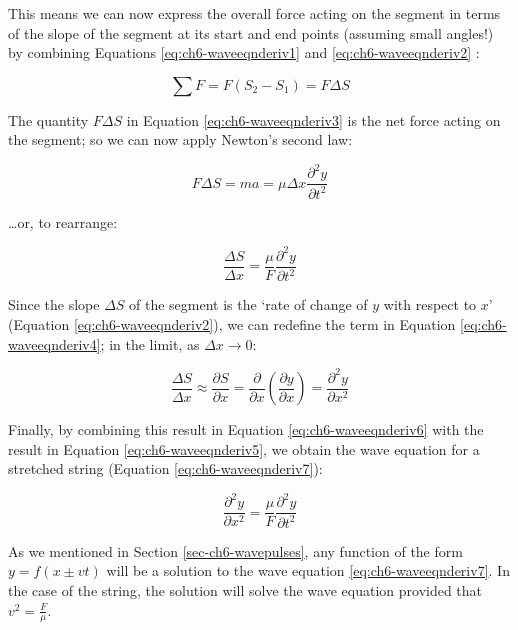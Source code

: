 \documentclass[
]{book}
\begin{document}
This means we can now express the overall force acting on the segment in terms of the slope of the segment at its start and end points (assuming small angles!) by combining Equations \eqref{eq:ch6-waveeqnderiv1} and \eqref{eq:ch6-waveeqnderiv2} :

\begin{equation}
\sum F = F(S_2 - S_1) = F \Delta S
\label{eq:ch6-waveeqnderiv3}
\end{equation}

The quantity \(F\Delta S\) in Equation \eqref{eq:ch6-waveeqnderiv3} is the net force acting on the segment; so we can now apply Newton's second law:

\begin{equation}
F\Delta S = m a = \mu \Delta x \frac{\partial^2 y}{\partial t^2}
\label{eq:ch6-waveeqnderiv4}
\end{equation}

\ldots or, to rearrange:

\begin{equation}
\frac{\Delta S}{\Delta x} = \frac{\mu}{F} \frac{\partial^2 y}{\partial t^2}
\label{eq:ch6-waveeqnderiv5}
\end{equation}

Since the slope \(\Delta S\) of the segment is the `rate of change of \(y\) with respect to \(x\)' (Equation \eqref{eq:ch6-waveeqnderiv2}), we can redefine the term in Equation \eqref{eq:ch6-waveeqnderiv4}; in the limit, as \(\Delta x \rightarrow 0\):

\begin{equation}
\frac{\Delta S}{\Delta x} \approx \frac{\partial S}{\partial x} = \frac{\partial}{\partial x} \left( \frac{\partial y}{\partial x} \right) = \frac{\partial^2 y}{\partial x^2}
\label{eq:ch6-waveeqnderiv6}
\end{equation}

Finally, by combining this result in Equation \eqref{eq:ch6-waveeqnderiv6} with the result in Equation \eqref{eq:ch6-waveeqnderiv5}, we obtain the wave equation for a stretched string (Equation \eqref{eq:ch6-waveeqnderiv7}):

\begin{equation}
\frac{\partial^2 y}{\partial x^2} = \frac{\mu}{F} \frac{\partial^2 y}{\partial t^2}
\label{eq:ch6-waveeqnderiv7}
\end{equation}

As we mentioned in Section \ref{sec-ch6-wavepulses}, any function of the form \(y = f(x \pm vt)\) will be a solution to the wave equation \eqref{eq:ch6-waveeqnderiv7}. In the case of the string, the solution will solve the wave equation provided that \(v^2 = \frac{F}{\mu}\).
\end{document}
